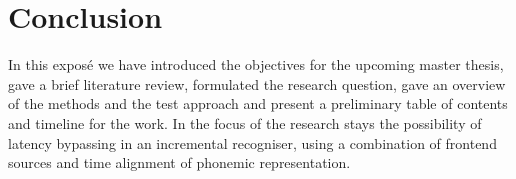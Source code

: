 \section {Conclusion}
In this expos\'{e}  we have introduced the objectives for the upcoming master
thesis, gave a brief literature review, formulated the research question, gave
an overview of the methods and the test approach and present a preliminary
table of contents and timeline for the work. In the focus of the research stays
the possibility of latency bypassing in an incremental recogniser,
using a combination of frontend sources and time alignment of phonemic
representation. 



%
%



%
%

%
\newpage
{} %
\printbibliography 
% 
%

%